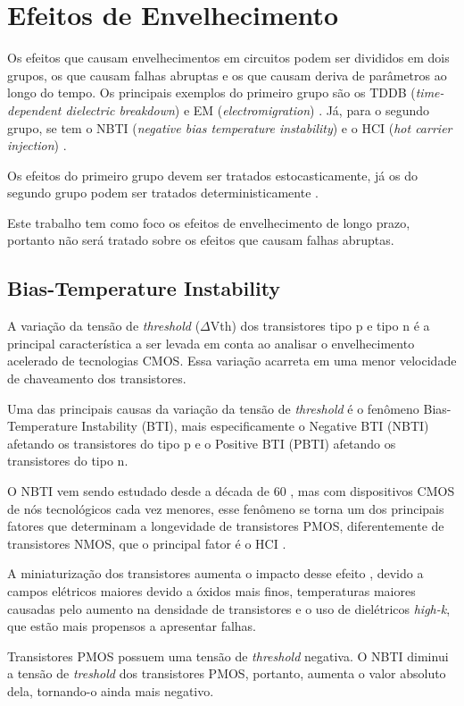 \section{Efeitos de Envelhecimento}
Os efeitos que causam envelhecimentos em circuitos podem ser divididos em dois grupos, os que causam falhas abruptas e os que causam deriva de parâmetros ao longo do tempo. Os principais exemplos do primeiro grupo são os TDDB (\textit{time-dependent dielectric breakdown}) e EM (\textit{electromigration}) \cite{Lorenz}. Já, para o segundo grupo, se tem o NBTI (\textit{negative bias temperature instability}) e o HCI (\textit{hot carrier injection}) \cite{Lorenz}.

Os efeitos do primeiro grupo devem ser tratados estocasticamente, já os do segundo grupo podem ser tratados deterministicamente \cite{Lorenz}.
       
Este trabalho tem como foco os efeitos de envelhecimento de longo prazo, portanto não será tratado sobre os efeitos que causam falhas abruptas.

\subsection{Bias-Temperature Instability}
A variação da tensão de \textit{threshold} ($\Delta$Vth) dos transistores tipo p e tipo n é a principal característica a ser levada em conta ao analisar o envelhecimento acelerado de tecnologias CMOS. Essa variação acarreta em uma menor velocidade de chaveamento dos transistores.

Uma das principais causas da variação da tensão de \textit{threshold} é o fenômeno Bias-Temperature Instability (BTI), mais especificamente o Negative BTI (NBTI) afetando os transistores do tipo p e o Positive BTI (PBTI) afetando os transistores do tipo n.

O NBTI vem sendo estudado desde a década de 60 \cite{Alam}, mas com dispositivos CMOS de nós tecnológicos cada vez menores, esse fenômeno se torna um dos principais fatores que determinam a longevidade de transistores PMOS, diferentemente de transistores NMOS, que o principal fator é o HCI \cite{Bhardwaj}.

A miniaturização dos transistores aumenta o impacto desse efeito \cite{Banaszeski}, devido a campos elétricos maiores devido a óxidos mais finos, temperaturas maiores causadas pelo aumento na densidade de transistores e o uso de dielétricos \textit{high-k}, que estão mais propensos a apresentar falhas.

Transistores PMOS possuem uma tensão de \textit{threshold} negativa. O NBTI diminui a tensão de \textit{treshold} dos transistores PMOS, portanto, aumenta o valor absoluto dela, tornando-o ainda mais negativo.




% 
